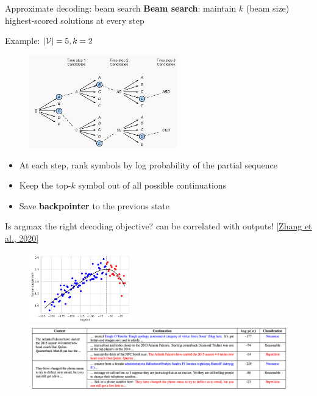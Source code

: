 \documentclass[usenames,dvipsnames,notes,11pt,aspectratio=169,hyperref={colorlinks=true, linkcolor=blue}]{beamer}
\begin{document}
\begin{frame}
    {Approximate decoding: beam search}
    \textbf{Beam search}: maintain $k$ (beam size) highest-scored  solutions at every step 
    
    Example: $|\mathcal{V}|=5, k=2$
    \vspace{-1em}
    \begin{figure}
        \includegraphics[height=4cm]{figures/beam-search}
    \end{figure}
    \vspace{-1em}

    \begin{itemize}
        \item At each step, rank symbols by log probability of the partial sequence
        \item Keep the top-$k$ symbol out of all possible continuations
        \item Save \textbf{backpointer} to the previous state
    \end{itemize}
\end{frame}

\begin{frame}
    {Is argmax the right decoding objective?}
     can be correlated with  outputs! \href{https://arxiv.org/abs/2004.10450}{[Zhang et al., 2020]}
    \begin{figure}
        \includegraphics[height=3cm]{figures/likelihood-trap}\\
        \includegraphics[width=\textwidth]{figures/likelihood-trap-ex}
    \end{figure}
\end{frame}
\end{document}
